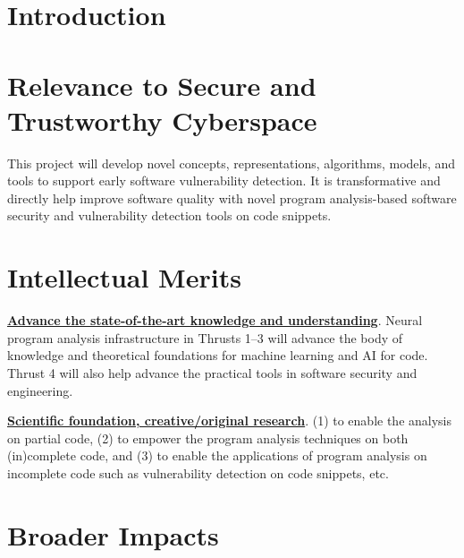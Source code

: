 \section{Introduction}
\label{sec:intro}







\section{Relevance to Secure and Trustworthy Cyberspace}

This project will develop novel concepts, representations, algorithms,
models, and tools to support early software vulnerability
detection. It is transformative and directly help improve software
quality with novel program analysis-based software security and
vulnerability detection tools on code snippets.

\section{Intellectual Merits}


\noindent \underline{{\bf Advance the state-of-the-art knowledge and
    understanding}}. Neural program analysis infrastructure in Thrusts
1--3 will advance the body of knowledge and theoretical foundations
for machine learning and AI for code. Thrust 4 will also help advance the
practical tools in software security and engineering.

\noindent \underline{{\bf Scientific foundation, creative/original
    research}}. (1) to enable the analysis on partial code, (2) to empower
the program analysis techniques on both (in)complete code,
and (3) to enable the applications of program analysis on incomplete
code such as vulnerability detection on code snippets, etc.

\section{Broader Impacts}

